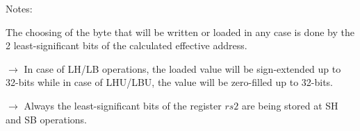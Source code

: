 \begin{threeparttable}
\begin{tablenotes}
			\footnotesize
			\item 
			Notes:
			\item 
			The choosing of the byte that will be written or loaded in any case is done by the 2 least-significant bits of the calculated effective address.
			\item
			\underline{\textbf{\textcolor{brightgreen}{$\rightarrow$}}} In case of LH/LB operations, the loaded value will be sign-extended up to 32-bits while in case of LHU/LBU, the value will be zero-filled up to 32-bits.
			\item 
			\underline{\textbf{\textcolor{capri!75}{$\rightarrow$}}} Always the least-significant bits of the register $rs2$ are being stored at SH and SB operations.
			
		\end{tablenotes}
	
		\label{subsubsec:table2.6}
		\vspace{5mm}
		
	\end{threeparttable}

	
	
%